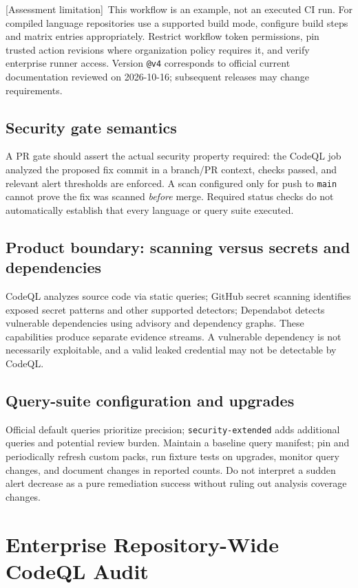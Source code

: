 \documentclass[11pt,letterpaper,oneside]{book}
\newcommand{\limt}{\textsf{[Assessment limitation]}}
\begin{document}
\limt\ This workflow is an example, not an executed CI run. For compiled language repositories use a supported build mode, configure build steps and matrix entries appropriately. Restrict workflow token permissions, pin trusted action revisions where organization policy requires it, and verify enterprise runner access. Version \texttt{@v4} corresponds to official current documentation reviewed on 2026-10-16; subsequent releases may change requirements.

\section{Security gate semantics}

A PR gate should assert the actual security property required: the CodeQL job analyzed the proposed fix commit in a branch/PR context, checks passed, and relevant alert thresholds are enforced. A scan configured only for push to \texttt{main} cannot prove the fix was scanned \emph{before} merge. Required status checks do not automatically establish that every language or query suite executed.

\section{Product boundary: scanning versus secrets and dependencies}

CodeQL analyzes source code via static queries; GitHub secret scanning identifies exposed secret patterns and other supported detectors; Dependabot detects vulnerable dependencies using advisory and dependency graphs. These capabilities produce separate evidence streams. A vulnerable dependency is not necessarily exploitable, and a valid leaked credential may not be detectable by CodeQL.

\section{Query-suite configuration and upgrades}

Official default queries prioritize precision; \texttt{security-extended} adds additional queries and potential review burden. Maintain a baseline query manifest; pin and periodically refresh custom packs, run fixture tests on upgrades, monitor query changes, and document changes in reported counts. Do not interpret a sudden alert decrease as a pure remediation success without ruling out analysis coverage changes.

\chapter{Enterprise Repository-Wide CodeQL Audit}
\end{document}
